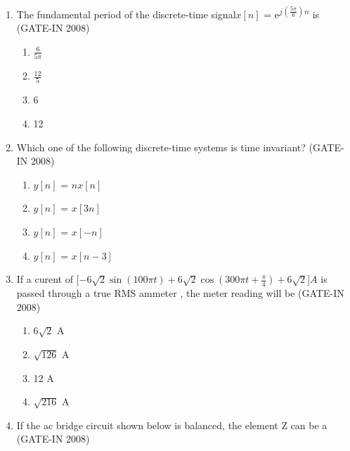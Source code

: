 \documentclass[journal,12pt,onecolumn]{IEEEtran}
\theoremstyle{remark}
\begin{document}
\begin{enumerate}
    \item  The fundamental period of the discrete-time signal$x[n]$ = e\textsuperscript{$j(\frac{5\pi}{6})n$} is  (GATE-IN 2008)
    \begin{multicols}{4}
    \begin{enumerate} 
        \item $\frac{6}{5\pi}$
        \item $\frac{12}{5}$
        \item 6
        \item 12
    \end{enumerate}
    \end{multicols}
    
    \item  Which one of the following discrete-time systems is time invariant? (GATE-IN 2008)
    \begin{multicols}{4}
    \begin{enumerate} 
        \item $y[n]$ = $nx[n]$
        \item $y[n]$ = $x[3n]$
        \item $y[n]$ = $x[-n]$
        \item $y[n]$ = $x[n-3]$
    \end{enumerate}
    \end{multicols}
    
    \item If a curent of [$-6\sqrt{2}\sin(100{\pi}t) +6\sqrt{2}\cos(300{\pi}t + \frac{\pi}{4}) + 6\sqrt{2}$]$A$ is passed through a true RMS ammeter , the meter reading will be (GATE-IN 2008) 
    \begin{multicols}{4}
    \begin{enumerate} 
        \item $6\sqrt{2}$ A
        \item $\sqrt{126}$ A
        \item 12 A
        \item $\sqrt{216}$ A
    \end{enumerate}
    \end{multicols}
    
    \item If the ac bridge circuit shown below is balanced, the element Z can be a  (GATE-IN 2008)


\end{enumerate}
\end{document}
